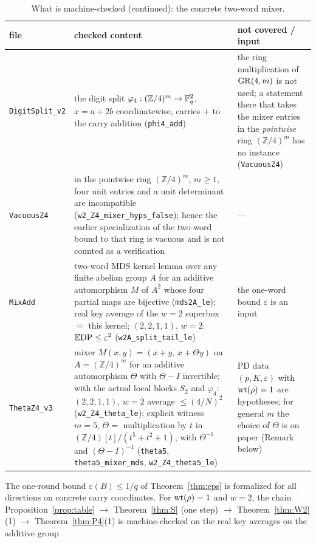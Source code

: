 \begin{table}[!htbp]\footnotesize
\caption{What is machine-checked (continued): the concrete two-word mixer.}\label{tab:lean3}
\begin{tabular}{p{}p{}p{}}
\toprule
file & checked content & not covered / input\\
\midrule
\texttt{DigitSplit\_v2} & the digit split $\varphi_4:(\mathbb Z/4)^m\to\mathbb{F}_q^2$, $x=a+2b$ coordinatewise, carries $+$ to the carry addition (\texttt{phi4\_add}) & the ring multiplication of $\mathrm{GR}(4,m)$ is not used; a statement there that takes the mixer entries in the \emph{pointwise} ring $(\mathbb Z/4)^m$ has no instance (\texttt{VacuousZ4})\\
\texttt{VacuousZ4} & in the pointwise ring $(\mathbb Z/4)^m$, $m\ge1$, four unit entries and a unit determinant are incompatible (\texttt{w2\_Z4\_mixer\_hyps\_false}); hence the earlier specialization of the two-word bound to that ring is vacuous and is not counted as a verification & ---\\
\texttt{MixAdd} & two-word MDS kernel lemma over any finite abelian group $A$ for an additive automorphism $M$ of $A^2$ whose four partial maps are bijective (\texttt{mds2A\_le}); real key average of the $w=2$ superbox $=$ this kernel; $(2,2,1,1)$, $w=2$: $\mathbb{E}\mathrm{DP}\le\varepsilon^2$ (\texttt{w2A\_split\_tail\_le}) & the one-word bound $\varepsilon$ is an input\\
\texttt{ThetaZ4\_v3} & mixer $M(x,y)=(x+y,\,x+\Theta y)$ on $A=(\mathbb Z/4)^m$ for an additive automorphism $\Theta$ with $\Theta-I$ invertible; with the actual local blocks $S_2$ and $\varphi_4$: $(2,2,1,1)$, $w=2$ average $\le(4/N)^2$ (\texttt{w2\_Z4\_theta\_le}); explicit witness $m=5$, $\Theta=$ multiplication by $t$ in $(\mathbb Z/4)[t]/(t^5+t^2+1)$, with $\Theta^{-1}$ and $(\Theta-I)^{-1}$ (\texttt{theta5}, \texttt{theta5\_mixer\_mds}, \texttt{w2\_Z4\_theta5\_le}) & PD data $(p,K,\varepsilon)$ with $\mathrm{wt}(\rho)=1$ are hypotheses; for general $m$ the choice of $\Theta$ is on paper (Remark below)\\
\bottomrule
\end{tabular}
\end{table}
The one-round bound $\varepsilon(B)\le1/q$ of Theorem~\ref{thm:eps} is formalized for all directions on concrete
carry coordinates. For $\mathrm{wt}(\rho)=1$ and $w=2$, the chain Proposition~\ref{prop:table} $\to$ Theorem~\ref{thm:S} (one step) $\to$
Theorem~\ref{thm:W2}(1) $\to$ Theorem~\ref{thm:P4}(1) is machine-checked on the real key averages on the additive group
